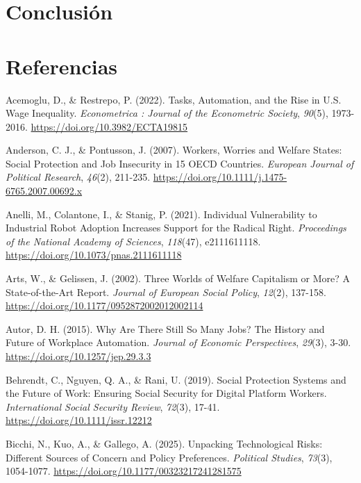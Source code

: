 \documentclass[
  spanish,
  12pt,
]{article}
\newlength{\cslhangindent}
\newenvironment{CSLReferences}[2] %
 {\begin{list}{}{%
  \setlength{\itemindent}{0pt}
  \setlength{\leftmargin}{0pt}
  \setlength{\parsep}{0pt}
  \ifodd #1
   \setlength{\leftmargin}{\cslhangindent}
   \setlength{\itemindent}{-1\cslhangindent}
  \fi
  \setlength{\itemsep}{#2\baselineskip}}}
 {\end{list}}
\begin{document}
\section{Conclusión}\label{conclusiuxf3n}

\section{Referencias}\label{referencias}

\protect{}\label{refs}
\begin{CSLReferences}{1}{0}
Acemoglu, D., \& Restrepo, P. (2022). Tasks, {Automation}, and the
{Rise} in {U}.{S}. {Wage Inequality}. \emph{Econometrica : Journal of
the Econometric Society}, \emph{90}(5), 1973-2016.
\url{https://doi.org/10.3982/ECTA19815}

Anderson, C. J., \& Pontusson, J. (2007). Workers, Worries and Welfare
States: {Social} Protection and Job Insecurity in 15 {OECD} Countries.
\emph{European Journal of Political Research}, \emph{46}(2), 211-235.
\url{https://doi.org/10.1111/j.1475-6765.2007.00692.x}

Anelli, M., Colantone, I., \& Stanig, P. (2021). Individual
Vulnerability to Industrial Robot Adoption Increases Support for the
Radical Right. \emph{Proceedings of the National Academy of Sciences},
\emph{118}(47), e2111611118.
\url{https://doi.org/10.1073/pnas.2111611118}

Arts, W., \& Gelissen, J. (2002). Three Worlds of Welfare Capitalism or
More? {A} State-of-the-Art Report. \emph{Journal of European Social
Policy}, \emph{12}(2), 137-158.
\url{https://doi.org/10.1177/0952872002012002114}

Autor, D. H. (2015). Why {Are There Still So Many Jobs}? {The History}
and {Future} of {Workplace Automation}. \emph{Journal of Economic
Perspectives}, \emph{29}(3), 3-30.
\url{https://doi.org/10.1257/jep.29.3.3}

Behrendt, C., Nguyen, Q. A., \& Rani, U. (2019). Social Protection
Systems and the Future of Work: {Ensuring} Social Security for Digital
Platform Workers. \emph{International Social Security Review},
\emph{72}(3), 17-41. \url{https://doi.org/10.1111/issr.12212}

Bicchi, N., Kuo, A., \& Gallego, A. (2025). Unpacking Technological
Risks: {Different} Sources of Concern and Policy Preferences.
\emph{Political Studies}, \emph{73}(3), 1054-1077.
\url{https://doi.org/10.1177/00323217241281575}


\end{CSLReferences}
\end{document}

